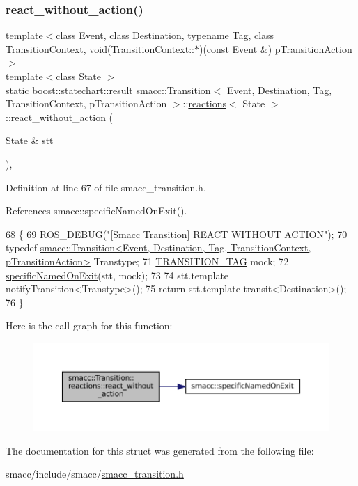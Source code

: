 \subsubsection{\texorpdfstring{react\+\_\+without\+\_\+action()}{react\_without\_action()}}
{\footnotesize\ttfamily template$<$class Event, class Destination, typename Tag, class Transition\+Context, void(\+Transition\+Context\+::$\ast$)(const Event \&) p\+Transition\+Action$>$ \\
template$<$class State $>$ \\
static boost\+::statechart\+::result \hyperlink{classsmacc_1_1Transition}{smacc\+::\+Transition}$<$ Event, Destination, Tag, Transition\+Context, p\+Transition\+Action $>$\+::\hyperlink{structsmacc_1_1Transition_1_1reactions}{reactions}$<$ State $>$\+::react\+\_\+without\+\_\+action (\begin{DoxyParamCaption}\item[{State \&}]{stt }\end{DoxyParamCaption})\hspace{0.3cm}{\ttfamily [inline]}, {\ttfamily [static]}}



Definition at line 67 of file smacc\+\_\+transition.\+h.



References smacc\+::specific\+Named\+On\+Exit().


\begin{DoxyCode}
68     \{
69       ROS\_DEBUG(\textcolor{stringliteral}{"[Smacc Transition] REACT WITHOUT ACTION"});
70       \textcolor{keyword}{typedef} 
      \hyperlink{classsmacc_1_1Transition}{smacc::Transition<Event, Destination, Tag, TransitionContext, pTransitionAction>}
       Transtype;
71       \hyperlink{classsmacc_1_1Transition_a672e883135344c4aea140381dd4d1c1d}{TRANSITION\_TAG} mock;
72       \hyperlink{namespacesmacc_afd94fcb8f8c410a0ced7954bf76e845d}{specificNamedOnExit}(stt, mock);
73 
74       stt.template notifyTransition<Transtype>();
75       \textcolor{keywordflow}{return} stt.template transit<Destination>();
76     \}
\end{DoxyCode}
Here is the call graph for this function\+:
\nopagebreak
\begin{figure}[H]
\begin{center}
\leavevmode
\includegraphics[width=350pt]{structsmacc_1_1Transition_1_1reactions_a96a69cf5b0cbd1e8fc49ca57efb37581_cgraph}
\end{center}
\end{figure}


The documentation for this struct was generated from the following file\+:\begin{DoxyCompactItemize}
\item 
smacc/include/smacc/\hyperlink{smacc__transition_8h}{smacc\+\_\+transition.\+h}\end{DoxyCompactItemize}
